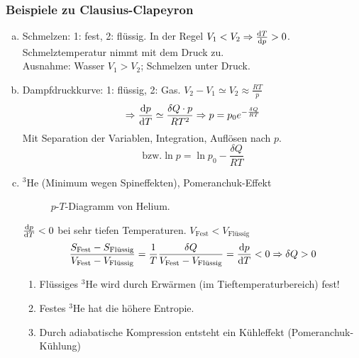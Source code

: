 \subsubsection{Beispiele zu Clausius-Clapeyron}
\begin{enumerate}[a)]
    \item Schmelzen: 1: fest, 2: flüssig. In der Regel $V_1 < V_2 \Rightarrow \frac{\mathrm{d} T}{\mathrm{d} p} > 0$. Schmelztemperatur nimmt mit dem Druck
    zu. \\
    Ausnahme: Wasser $V_1 > V_2$; Schmelzen unter Druck.
    \item Dampfdruckkurve: 1: flüssig, 2: Gas. $V_2 - V_1 \simeq V_2 \approx \frac{R T}{p}$
    \begin{equation}
        \Rightarrow \frac{\mathrm{d} p}{\mathrm{d} T} \simeq \frac{\delta Q \cdot p}{R T^2} \Rightarrow p = p_0 e^{- \frac{\delta Q}{R T}}
    \end{equation}
    Mit Separation der Variablen, Integration, Auflösen nach $p$.
    \begin{equation}
        \text{bzw.} \ln p = \ln p_0 - \frac{\delta Q}{R T}
    \end{equation}
    \item ${}^3\text{He}$ (Minimum wegen Spineffekten), Pomeranchuk-Effekt
   
    \begin{figure}[H]
        \centering
        \def\svgwidth{0.5\textwidth}
        
        \caption{$p$-$T$-Diagramm von Helium.}
        \label{img:HeliumpT}
    \end{figure}
    
    $\frac{\mathrm{d} p}{\mathrm{d} T} < 0$ bei sehr tiefen Temperaturen. $V_\text{Fest} < V_\text{Flüssig}$
    \begin{equation}
        \frac{S_\text{Fest} - S_\text{Flüssig}}{V_\text{Fest} - V_\text{Flüssig}} = \frac{1}{T} \frac{\delta Q}{V_\text{Fest} - V_\text{Flüssig}} =
        \frac{\mathrm{d} p}{\mathrm{d} T} < 0 \Rightarrow \delta Q > 0
    \end{equation}
    \begin{enumerate}[1.]
        \item Flüssiges ${}^3\text{He}$ wird durch Erwärmen (im Tieftemperaturbereich) fest!
        \item Festes ${}^3\text{He}$ hat die höhere Entropie.
        \item Durch adiabatische Kompression entsteht ein Kühleffekt (Pomeranchuk-Kühlung)
    \end{enumerate}
\end{enumerate}

